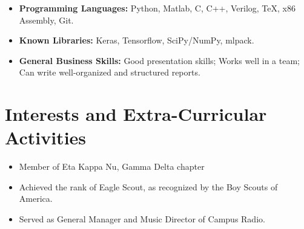 \documentclass[11pt,a4paper,sans]{moderncv}        %
\begin{document}
\vspace{3pt}

\begin{itemize}[label={}]

\item \textbf{Programming Languages: }Python, Matlab, C, C++, Verilog, TeX, x86 Assembly, Git.
\vspace{1.5pt}
\item \textbf{Known Libraries: }Keras, Tensorflow, SciPy/NumPy, mlpack.
\vspace{1.5pt}
\item \textbf{General Business Skills:} Good presentation skills; Works well in a team; Can write well-organized and structured reports.

\end{itemize}

\section{Interests and Extra-Curricular Activities}


\begin{itemize}

\item{Member of Eta Kappa Nu, Gamma Delta chapter}
\item{Achieved the rank of Eagle Scout, as recognized by the Boy Scouts of America.}
\item{Served as General Manager and Music Director of Campus Radio.}

\end{itemize}

%


\end{document}
